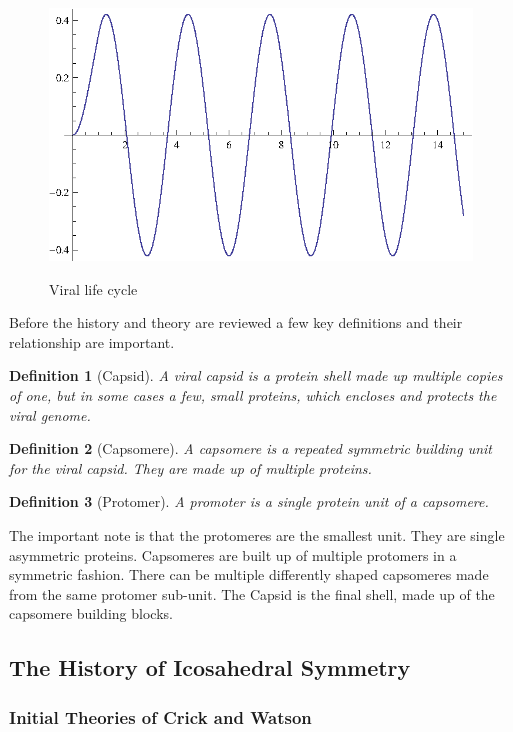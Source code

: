 \documentclass[12pt,letter]{article}
\newtheorem*{definition*}{Definition}
\begin{document}
\begin{figure}[h]
	\caption{Viral life cycle}
	\centering
	\includegraphics{place_holder.eps}
	\label{fig:virus_types}
\end{figure}

Before the history and theory are reviewed a few key definitions and their relationship are important.

\begin{definition*}[Capsid]
A viral capsid is a protein shell made up multiple copies of one, but in some cases a few, small proteins, which encloses and protects the viral genome.
\end{definition*}
\begin{definition*}[Capsomere]
A capsomere is a repeated symmetric building unit for the viral capsid. They are made up of multiple proteins.
\end{definition*}
\begin{definition*}[Protomer]
A promoter is a single protein unit of a capsomere.
\end{definition*}

The important note is that the protomeres are the smallest unit. They are single asymmetric proteins. Capsomeres are built up of multiple protomers in a symmetric fashion. There can be multiple differently shaped capsomeres made from the same protomer sub-unit. The Capsid is the final shell, made up of the capsomere building blocks.

\subsection{The History of Icosahedral Symmetry} %

\subsubsection{Initial Theories of Crick and Watson}
\end{document}
